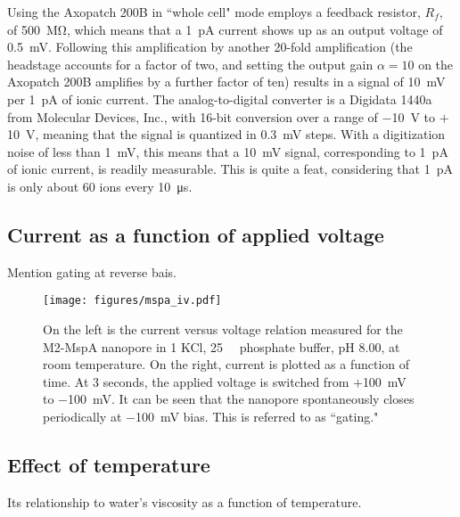 Using the Axopatch 200B in ``whole cell" mode employs a feedback resistor, $R_f$, of \SI{500}{\mega\ohm}, which means that a \SI{1}{\pico\ampere} current shows up as an output voltage of \SI{0.5}{\milli\volt}.  Following this amplification by another 20-fold amplification (the headstage accounts for a factor of two, and setting the output gain $\alpha=10$ on the Axopatch 200B amplifies by a further factor of ten) results in a signal of \SI{10}{\milli\volt} per \SI{1}{\pico\ampere} of ionic current.  The analog-to-digital converter is a Digidata 1440a from Molecular Devices, Inc., with 16-bit conversion over a range of \SI{-10}{\volt} to $+$\SI{10}{\volt}, meaning that the signal is quantized in \SI{0.3}{\milli\volt} steps.  With a digitization noise of less than \SI{1}{\milli\volt}, this means that a \SI{10}{\milli\volt} signal, corresponding to \SI{1}{\pico\ampere} of ionic current, is readily measurable.  This is quite a feat, considering that \SI{1}{\pico\ampere} is only about \num{60} ions every \SI{10}{\micro\second}.

\subsection{Current as a function of applied voltage}

Mention gating at reverse bais.

\begin{figure}[h]
\begin{centering}
\texttt{[image: figures/mspa\_iv.pdf]}
\caption[MspA current versus voltage]{On the left is the current versus voltage relation measured for the M2-MspA nanopore in \SI{1}{\Molar} KCl, \SI{25}{\milli\Molar} phosphate buffer, pH \num{8.00}, at room temperature.  On the right, current is plotted as a function of time.  At \num{3} seconds, the applied voltage is switched from $+$\SI{100}{\milli\volt} to \SI{-100}{\milli\volt}.  It can be seen that the nanopore spontaneously closes periodically at \SI{-100}{\milli\volt} bias.  This is referred to as ``gating."}
\label{fig:iv_mspa}
\end{centering}
\end{figure}

\subsection{Effect of temperature}

Its relationship to water's viscosity as a function of temperature.

